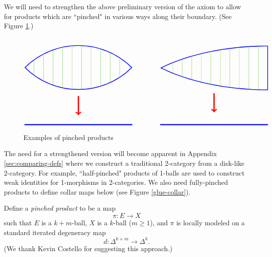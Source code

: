 We will need to strengthen the above preliminary version of the axiom to allow
for products which are ``pinched" in various ways along their boundary.
(See Figure \ref{pinched_prods}.)
\begin{figure}[t]
$$
\begin{tikzpicture}[baseline=0]
\begin{scope}
\path[clip] (0,0) arc (135:45:4) arc (-45:-135:4);
\draw[blue,line width=2pt] (0,0) arc (135:45:4) arc (-45:-135:4);
\foreach \x in {0, 0.5, ..., 6} {
	\draw[green!50!brown] (\x,-2) -- (\x,2);
}
\end{scope}
\draw[blue,line width=1.5pt] (0,-3) -- (5.66,-3);
\draw[->,red,line width=2pt] (2.83,-1.5) -- (2.83,-2.5);
\end{tikzpicture}
\qquad \qquad
\begin{tikzpicture}[baseline=-0.15cm]
\begin{scope}
\path[clip] (0,1) arc (90:135:8 and 4)  arc (-135:-90:8 and 4) -- cycle;
\draw[blue,line width=2pt] (0,1) arc (90:135:8 and 4)  arc (-135:-90:8 and 4) -- cycle;
\foreach \x in {-6, -5.5, ..., 0} {
	\draw[green!50!brown] (\x,-2) -- (\x,2);
}
\end{scope}
\draw[blue,line width=1.5pt] (-5.66,-3.15) -- (0,-3.15);
\draw[->,red,line width=2pt] (-2.83,-1.5) -- (-2.83,-2.5);
\end{tikzpicture}
$$
\caption{Examples of pinched products}\label{pinched_prods}
\end{figure}
The need for a strengthened version will become apparent in Appendix \ref{sec:comparing-defs}
where we construct a traditional 2-category from a disk-like 2-category.
For example, ``half-pinched" products of 1-balls are used to construct weak identities for 1-morphisms
in 2-categories.
We also need fully-pinched products to define collar maps below (see Figure \ref{glue-collar}).

Define a {\it pinched product} to be a map
\[
	\pi: E\to X
\]
such that $E$ is a $k{+}m$-ball, $X$ is a $k$-ball ($m\ge 1$), and $\pi$ is locally modeled
on a standard iterated degeneracy map
\[
	d: \Delta^{k+m}\to\Delta^k .
\]
(We thank Kevin Costello for suggesting this approach.)

